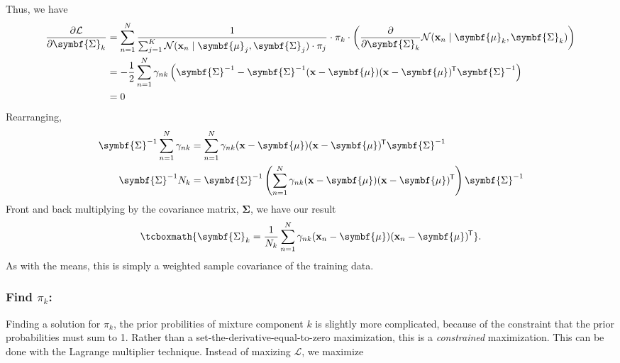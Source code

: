 \documentclass[11pt]{article}
\newcommand{\xb}{\mathbf{x}}
\newcommand{\ub}{\symbf{\mu}}
\newcommand{\Sb}{\symbf{\Sigma}}
\newcommand*{\tran}{^{\mkern-1.5mu\mathsf{T}}}
\begin{document}
Thus, we have
\begin{align*}
  \frac{\partial\mathcal{L}}{\partial\Sb_k} &= \sum_{n=1}^N
    \frac{1}{\sum_{j=1}^K \mathcal{N}(\xb_n \mid \ub_j, \Sb_j) \cdot \pi_j}
    \cdot \pi_k \cdot \left(\frac{\partial}{\partial \Sb_k}
                            \mathcal{N}(\xb_n \mid \ub_k, \Sb_k)\right) \\
  &= -\frac{1}{2} \sum_{n=1}^N \gamma_{nk} \left(
    \Sb^{-1} - \Sb^{-1} (\xb-\ub) (\xb-\ub) \tran \Sb^{-1}
  \right) \\
  &=0
\end{align*}
Rearranging,
\begin{align*}
  \Sb^{-1} \sum_{n=1}^N \gamma_{nk}  &=
   \sum_{n=1}^N \gamma_{nk} (\xb-\ub) (\xb-\ub) \tran \Sb^{-1} \\
  \Sb^{-1} N_k &= \Sb^{-1}
    \left(\sum_{n=1}^N\gamma_{nk} (\xb-\ub)(\xb-\ub)\tran\right) \Sb^{-1}
\end{align*}
Front and back multiplying by the covariance matrix, $\Sb$, we have our result
\begin{equation}
  \tcboxmath{\Sb_k = \frac{1}{N_k} \sum_{n=1}^N \gamma_{nk}
  (\xb_n - \ub) (\xb_n - \ub)\tran}.
  \label{eqn:sigma}
\end{equation}
As with the means, this is simply a weighted sample covariance of the training
data.

\subsubsection{Find $\pi_k$:}
Finding a solution for $\pi_k$, the prior probilities of mixture component $k$
is slightly more complicated, because of the constraint that the prior
probabilities must sum to 1. Rather than a set-the-derivative-equal-to-zero
maximization, this is a \textit{constrained} maximization. This can be done
with the Lagrange multiplier technique. Instead of maxizing $\mathcal{L}$, we
maximize
\end{document}

